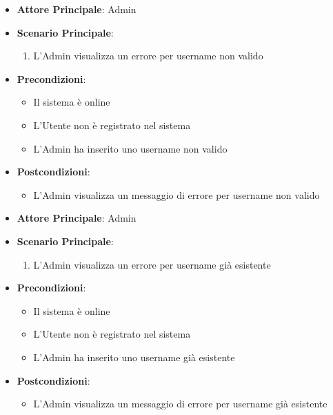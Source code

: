 \label{uc_32.2.1}

\begin{itemize}
    \item \textbf{Attore Principale}: Admin
    \item \textbf{Scenario Principale}:
    \begin{enumerate}
        \item L'Admin visualizza un errore per username non valido
    \end{enumerate}
    \item \textbf{Precondizioni}:
    \begin{itemize}
        \item Il sistema è online
        \item L'Utente non è registrato nel sistema
        \item L'Admin ha inserito uno username non valido
    \end{itemize}
    \item \textbf{Postcondizioni}:
    \begin{itemize}
        \item L'Admin visualizza un messaggio di errore per username non valido
    \end{itemize}
\end{itemize}

\label{uc_32.2.2}

\begin{itemize}
    \item \textbf{Attore Principale}: Admin
    \item \textbf{Scenario Principale}:
    \begin{enumerate}
        \item L'Admin visualizza un errore per username già esistente
    \end{enumerate}
    \item \textbf{Precondizioni}:
    \begin{itemize}
        \item Il sistema è online
        \item L'Utente non è registrato nel sistema
        \item L'Admin ha inserito uno username già esistente
    \end{itemize}
    \item \textbf{Postcondizioni}:
    \begin{itemize}
        \item L'Admin visualizza un messaggio di errore per username già esistente
    \end{itemize}
\end{itemize}

